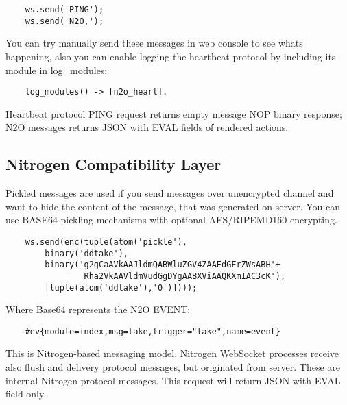 \vspace{1\baselineskip}
\begin{lstlisting}
    ws.send('PING');
    ws.send('N2O,');
\end{lstlisting}
\vspace{1\baselineskip}

You can try manually send these messages in web console to see whats happening,
also you can enable logging the heartbeat protocol by including its module in log\_modules:

\vspace{1\baselineskip}
\begin{lstlisting}
    log_modules() -> [n2o_heart].
\end{lstlisting}
\vspace{1\baselineskip}

Heartbeat protocol PING request returns empty message NOP binary response;
N2O messages returns JSON with EVAL fields of rendered actions.

\subsection{Nitrogen Compatibility Layer}

Pickled messages are used if you send messages over unencrypted
channel and want to hide the content of the message,
that was generated on server. You can use BASE64 pickling mechanisms
with optional AES/RIPEMD160 encrypting.

\vspace{1\baselineskip}
\begin{lstlisting}
    ws.send(enc(tuple(atom('pickle'),
        binary('ddtake'),
        binary('g2gCaAVkAAJldmQABWluZGV4ZAAEdGFrZWsABH'+
                Rha2VkAAVldmVudGgDYgAABXViAAQKXmIAC3cK'),
        [tuple(atom('ddtake'),'0')])));
\end{lstlisting}
\vspace{1\baselineskip}

Where Base64 represents the N2O EVENT:

\vspace{1\baselineskip}
\begin{lstlisting}
    #ev{module=index,msg=take,trigger="take",name=event}
\end{lstlisting}
\vspace{1\baselineskip}

This is Nitrogen-based messaging model. Nitrogen WebSocket processes receive also
flush and delivery protocol messages, but originated from server. These are internal Nitrogen
protocol messages. This request will return JSON with EVAL field only.

